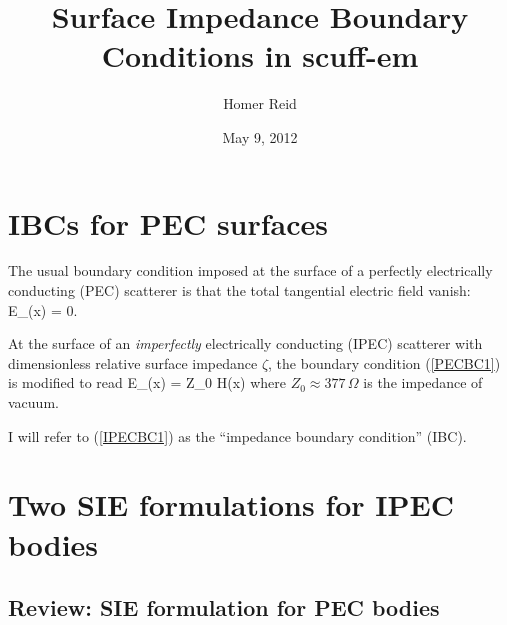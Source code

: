 \documentclass{article}
\title{Surface Impedance Boundary Conditions in {\sc scuff-em}}
\author {Homer Reid}
\date {May 9, 2012}
\begin{document}
\maketitle

\pagestyle{myheadings}

\tableofcontents 

\newpage
\section{IBCs for PEC surfaces}

The usual boundary condition imposed at the surface of a
perfectly electrically conducting (PEC) scatterer is that
the total tangential electric field vanish:
 { \vb E_{\parallel}(\vb x) = 0. }

At the surface of an \textit{imperfectly} electrically conducting
(IPEC) scatterer with dimensionless relative surface impedance
$\zeta$, the boundary condition (\ref{PECBC1}) is modified to
read 
{
\vb E_{\parallel}(\vb x)
= \zeta Z_0 \times \vb H(\vb x)
}
where $Z_0\approx 377\,\Omega$ is the impedance of vacuum.

I will refer to (\ref{IPECBC1}) as the ``impedance boundary condition'' (IBC).

\newpage
\section{Two SIE formulations for IPEC bodies}

\subsection{Review: SIE formulation for PEC bodies}
\end{document}
